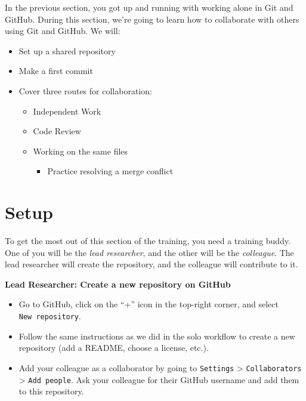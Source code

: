 \documentclass[
]{book}
\providecommand{\tightlist}{%
  \setlength{\itemsep}{0pt}\setlength{\parskip}{0pt}}
\begin{document}
In the previous section, you got up and running with working alone in Git and
GitHub. During this section, we're going to learn how to collaborate with others
using Git and GitHub. We will:

\begin{itemize}
\tightlist
\item
  Set up a shared repository
\item
  Make a first commit
\item
  Cover three routes for collaboration:

  \begin{itemize}
  \tightlist
  \item
    Independent Work
  \item
    Code Review
  \item
    Working on the same files

    \begin{itemize}
    \tightlist
    \item
      Practice resolving a merge conflict
    \end{itemize}
  \end{itemize}
\end{itemize}

\section{Setup}\label{setup}

To get the most out of this section of the training, you need a training buddy.
One of you will be the \emph{lead researcher}, and the other will be the \emph{colleague}.
The lead researcher will create the repository, and the colleague will contribute to it.

\textbf{Lead Researcher: Create a new repository on GitHub}

\begin{itemize}
\tightlist
\item
  Go to GitHub, click on the ``+'' icon in the top-right corner, and select \texttt{New\ repository}.
\item
  Follow the same instructions as we did in the solo workflow to create a new
  repository (add a README, choose a license, etc.).
\item
  Add your colleague as a collaborator by going to
  \texttt{Settings} \textgreater{} \texttt{Collaborators} \textgreater{} \texttt{Add\ people}. Ask your colleague for their
  GitHub username and add them to this repository.
\end{itemize}
\end{document}

